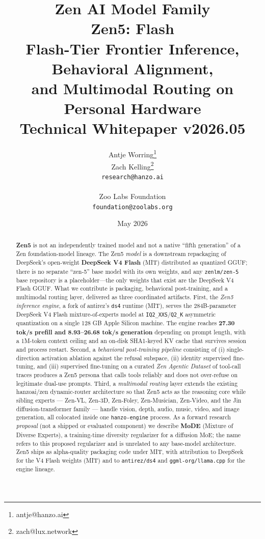 \documentclass[11pt,a4paper]{article}
\title{
    \vspace{-2cm}
    \Large \textbf{Zen AI Model Family} \\
    \vspace{0.5cm}
    \Huge \textbf{Zen5: Flash} \\
    \vspace{0.3cm}
    \large Flash-Tier Frontier Inference, Behavioral Alignment, \\
    and Multimodal Routing on Personal Hardware \\
    \vspace{0.5cm}
    \normalsize Technical Whitepaper v2026.05
}
\author{
    Antje Worring\thanks{antje@hanzo.ai} \\
    Zach Kelling\thanks{zach@lux.network} \\
    \texttt{research@hanzo.ai} \\
    \\
    Zoo Labs Foundation \\
    \texttt{foundation@zoolabs.org}
}
\date{May 2026}
\begin{document}
\maketitle

\begin{abstract}
\textbf{Zen5} is not an independently trained model and not a native ``fifth generation'' of a Zen
foundation-model lineage. The Zen5 \emph{model} is a downstream repackaging of DeepSeek's open-weight
\textbf{DeepSeek V4 Flash} \cite{deepseekv4flash} (MIT) distributed as quantized GGUF; there is no
separate ``zen-5'' base model with its own weights, and any \texttt{zenlm/zen-5} base repository is a
placeholder---the only weights that exist are the DeepSeek V4 Flash GGUF. What we contribute is
packaging, behavioral post-training, and a multimodal routing layer, delivered as three coordinated
artifacts. First, the \emph{Zen5 inference engine}, a fork of antirez's \texttt{ds4} runtime
\cite{antirez-ds4} (MIT), serves the 284B-parameter DeepSeek V4 Flash mixture-of-experts model at
\texttt{IQ2\_XXS}/\texttt{Q2\_K} asymmetric quantization on a single 128 GB Apple Silicon machine. The engine reaches \textbf{27.30 tok/s
prefill and 8.93--26.68 tok/s generation} depending on prompt length, with a 1M-token context ceiling
and an on-disk SHA1-keyed KV cache that survives session and process restart. Second, a
\emph{behavioral post-training pipeline} consisting of (i) single-direction activation ablation against
the refusal subspace, (ii) identity supervised fine-tuning, and (iii) supervised fine-tuning on a curated
\emph{Zen Agentic Dataset} of tool-call traces produces a Zen5 persona that calls tools reliably and
does not over-refuse on legitimate dual-use prompts. Third, a \emph{multimodal routing} layer extends the
existing hanzoai/zen dynamic-router architecture so that Zen5 acts as the reasoning core while sibling
experts --- Zen-VL, Zen-3D, Zen-Foley, Zen-Musician, Zen-Video, and the Jin diffusion-transformer family ---
handle vision, depth, audio, music, video, and image generation, all colocated inside one
\texttt{hanzo-engine} process. As a forward research \emph{proposal} (not a shipped or evaluated
component) we describe \textbf{MoDE} (Mixture of Diverse Experts), a training-time diversity regularizer
for a diffusion MoE; the name refers to this proposed regularizer and is unrelated to any base-model
architecture. Zen5 ships as alpha-quality packaging code under MIT, with attribution to DeepSeek for the
V4 Flash weights (MIT) \cite{deepseekv4flash} and to \texttt{antirez/ds4} \cite{antirez-ds4} and
\texttt{ggml-org/llama.cpp} \cite{llamacpp} for the engine lineage.
\end{abstract}
\end{document}
